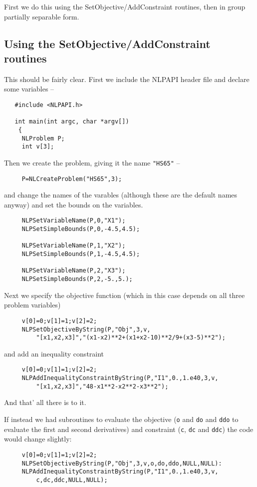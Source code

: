 \documentclass[12pt]{article}
\begin{document}
  First we do this using the SetObjective/AddConstraint routines, then in  
  group partially separable form.

  \subsection{Using the SetObjective/AddConstraint routines}

   This should be fairly clear. First we include the NLPAPI header file and declare some variables --
   \begin{verbatim}
   #include <NLPAPI.h>
   
   int main(int argc, char *argv[])
    {
     NLProblem P;
     int v[3];
    \end{verbatim}
   Then we create the problem, giving it the name {\tt "HS65"} --
    \begin{verbatim}
     P=NLCreateProblem("HS65",3);
    \end{verbatim}
   and change the names of the varables (although these are the default names anyway) and
   set the bounds on the variables.
    \begin{verbatim} 
     NLPSetVariableName(P,0,"X1");
     NLPSetSimpleBounds(P,0,-4.5,4.5);
   
     NLPSetVariableName(P,1,"X2");
     NLPSetSimpleBounds(P,1,-4.5,4.5);

     NLPSetVariableName(P,2,"X3");
     NLPSetSimpleBounds(P,2,-5.,5.);
    \end{verbatim}
    Next we specify the objective function (which in this case depends on all three problem variables)
    \begin{verbatim} 
     v[0]=0;v[1]=1;v[2]=2;
     NLPSetObjectiveByString(P,"Obj",3,v,
         "[x1,x2,x3]","(x1-x2)**2+(x1+x2-10)**2/9+(x3-5)**2");
    \end{verbatim}
    and add an inequality constraint
    \begin{verbatim} 
     v[0]=0;v[1]=1;v[2]=2;
     NLPAddInequalityConstraintByString(P,"I1",0.,1.e40,3,v,
         "[x1,x2,x3]","48-x1**2-x2**2-x3**2");
    \end{verbatim}
    And that' all there is to it.

    If instead we had subroutines to evaluate the objective ({\tt o} and {\tt do} and {\tt ddo} to
    evaluate the first and second derivatives) and constraint ({\tt c}, {\tt dc} and {\tt ddc})
    the code would change slightly:
    \begin{verbatim} 
     v[0]=0;v[1]=1;v[2]=2;
     NLPSetObjectiveByString(P,"Obj",3,v,o,do,ddo,NULL,NULL):
     NLPAddInequalityConstraintByString(P,"I1",0.,1.e40,3,v,
         c,dc,ddc,NULL,NULL);
    \end{verbatim}
\end{document}
